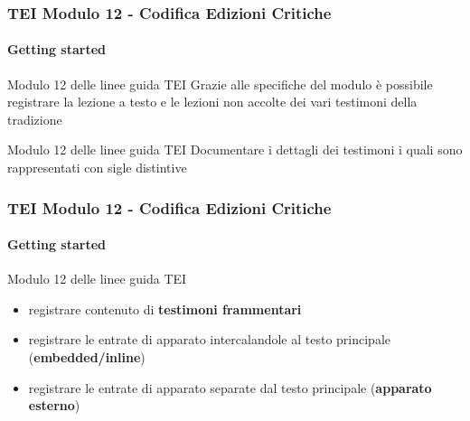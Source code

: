 \begin{frame}
    \frametitle{TEI Modulo 12 - Codifica Edizioni Critiche}
    \framesubtitle{Getting started}
    \addtocounter{nframe}{1}




    \begin{block}{Modulo 12 delle linee guida TEI}
       Grazie alle specifiche del modulo è possibile registrare la lezione a testo e le lezioni non accolte dei vari testimoni della tradizione
    \end{block}

    \begin{block}{Modulo 12 delle linee guida TEI}
       Documentare i dettagli dei testimoni i quali sono rappresentati con sigle distintive
     \end{block}

\end{frame}

\begin{frame}
    \frametitle{TEI Modulo 12 - Codifica Edizioni Critiche}
    \framesubtitle{Getting started}
    \addtocounter{nframe}{1}


    \begin{block}{Modulo 12 delle linee guida TEI}
        \begin{itemize}
            \item registrare contenuto di \textbf{testimoni frammentari}
            \item registrare le entrate di apparato intercalandole al testo principale (\textbf{embedded/inline})
            \item registrare le entrate di apparato separate dal testo principale (\textbf{apparato esterno})
        \end{itemize}
    \end{block}


\end{frame}

